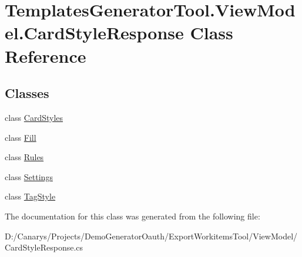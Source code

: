 \hypertarget{class_templates_generator_tool_1_1_view_model_1_1_card_style_response}{}\section{Templates\+Generator\+Tool.\+View\+Model.\+Card\+Style\+Response Class Reference}
\label{class_templates_generator_tool_1_1_view_model_1_1_card_style_response}
\subsection*{Classes}
\begin{DoxyCompactItemize}
\item 
class \mbox{\hyperlink{class_templates_generator_tool_1_1_view_model_1_1_card_style_response_1_1_card_styles}{Card\+Styles}}
\item 
class \mbox{\hyperlink{class_templates_generator_tool_1_1_view_model_1_1_card_style_response_1_1_fill}{Fill}}
\item 
class \mbox{\hyperlink{class_templates_generator_tool_1_1_view_model_1_1_card_style_response_1_1_rules}{Rules}}
\item 
class \mbox{\hyperlink{class_templates_generator_tool_1_1_view_model_1_1_card_style_response_1_1_settings}{Settings}}
\item 
class \mbox{\hyperlink{class_templates_generator_tool_1_1_view_model_1_1_card_style_response_1_1_tag_style}{Tag\+Style}}
\end{DoxyCompactItemize}


The documentation for this class was generated from the following file\+:\begin{DoxyCompactItemize}
\item 
D\+:/\+Canarys/\+Projects/\+Demo\+Generator\+Oauth/\+Export\+Workitems\+Tool/\+View\+Model/Card\+Style\+Response.\+cs\end{DoxyCompactItemize}
